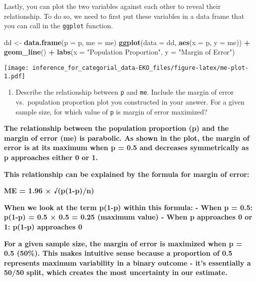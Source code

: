 \documentclass[
]{article}
\newenvironment{Shaded}{\begin{snugshade}}{\end{snugshade}}
\newcommand{\AttributeTok}[1]{\textcolor[rgb]{0.13,0.29,0.53}{#1}}
\newcommand{\FunctionTok}[1]{\textcolor[rgb]{0.13,0.29,0.53}{\textbf{#1}}}
\newcommand{\NormalTok}[1]{#1}
\newcommand{\OtherTok}[1]{\textcolor[rgb]{0.56,0.35,0.01}{#1}}
\newcommand{\SpecialCharTok}[1]{\textcolor[rgb]{0.81,0.36,0.00}{\textbf{#1}}}
\newcommand{\StringTok}[1]{\textcolor[rgb]{0.31,0.60,0.02}{#1}}
\providecommand{\tightlist}{%
  \setlength{\itemsep}{0pt}\setlength{\parskip}{0pt}}
\begin{document}
Lastly, you can plot the two variables against each other to reveal
their relationship. To do so, we need to first put these variables in a
data frame that you can call in the \texttt{ggplot} function.

\begin{Shaded}
\begin{Highlighting}[]
\NormalTok{dd }\OtherTok{\textless{}{-}} \FunctionTok{data.frame}\NormalTok{(}\AttributeTok{p =}\NormalTok{ p, }\AttributeTok{me =}\NormalTok{ me)}
\FunctionTok{ggplot}\NormalTok{(}\AttributeTok{data =}\NormalTok{ dd, }\FunctionTok{aes}\NormalTok{(}\AttributeTok{x =}\NormalTok{ p, }\AttributeTok{y =}\NormalTok{ me)) }\SpecialCharTok{+} 
  \FunctionTok{geom\_line}\NormalTok{() }\SpecialCharTok{+}
  \FunctionTok{labs}\NormalTok{(}\AttributeTok{x =} \StringTok{"Population Proportion"}\NormalTok{, }\AttributeTok{y =} \StringTok{"Margin of Error"}\NormalTok{)}
\end{Highlighting}
\end{Shaded}

\texttt{[image: inference\_for\_categorial\_data-EKO\_files/figure-latex/me-plot-1.pdf]}

\begin{enumerate}
\def\labelenumi{\arabic{enumi}.}
\setcounter{enumi}{4}
\tightlist
\item
  Describe the relationship between \texttt{p} and \texttt{me}. Include
  the margin of error vs.~population proportion plot you constructed in
  your answer. For a given sample size, for which value of \texttt{p} is
  margin of error maximized?
\end{enumerate}

\textbf{The relationship between the population proportion (p) and the
margin of error (me) is parabolic. As shown in the plot, the margin of
error is at its maximum when p = 0.5 and decreases symmetrically as p
approaches either 0 or 1.}

\textbf{This relationship can be explained by the formula for margin of
error:}

\textbf{ME = 1.96 × √(p(1-p)/n)}

\textbf{When we look at the term p(1-p) within this formula: - When p =
0.5: p(1-p) = 0.5 × 0.5 = 0.25 (maximum value) - When p approaches 0 or
1: p(1-p) approaches 0}

\textbf{For a given sample size, the margin of error is maximized when p
= 0.5 (50\%). This makes intuitive sense because a proportion of 0.5
represents maximum variability in a binary outcome - it's essentially a
50/50 split, which creates the most uncertainty in our estimate.}
\end{document}
